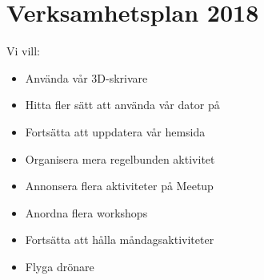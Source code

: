 \documentclass[a4paper,11pt,oneside]{article}
\begin{document}
\section*{Verksamhetsplan 2018}

Vi vill: \\
\begin{itemize}
\item Använda vår 3D-skrivare
\item Hitta fler sätt att använda vår dator på
\item Fortsätta att uppdatera vår hemsida
\item Organisera mera regelbunden aktivitet
\item Annonsera flera aktiviteter på Meetup
\item Anordna flera workshops
\item Fortsätta att hålla måndagsaktiviteter
\item Flyga drönare
\end{itemize}
\end{document}
